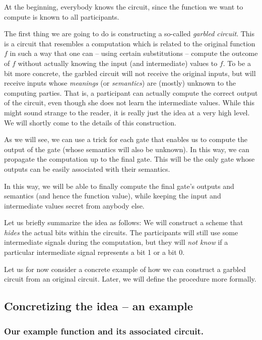 \message{ !name(seminar.tex)}\documentclass{llncs}
\begin{document}
At the beginning, everybody knows the circuit, since the function we want to compute is known to all participants.

The first thing we are going to do is constructing a so-called \emph{garbled circuit}. This is a circuit that resembles a computation which is related to the original function $f$ in such a way that one can -- using certain substitutions -- compute the outcome of $f$ without actually knowing the input (and intermediate) values to $f$. To be a bit more concrete, the garbled circuit will not receive the original inputs, but will receive inputs whose \emph{meanings} (or \emph{semantics}) are (mostly) unknown to the computing parties. That is, a participant can actually compute the correct output of the circuit, even though she does not learn the intermediate values. While this might sound strange to the reader, it is really just the idea at a very high level. We will shortly come to the details of this construction.

As we will see, we can use a trick for each gate that enables us to compute the output of the gate (whose semantics will also be unknown). In this way, we can propagate the computation up to the final gate. This will be the only gate whose outputs can be easily associated with their semantics.

In this way, we will be able to finally compute the final gate's outputs and semantics (and hence the function value), while keeping the input and intermediate values secret from anybody else.

Let us briefly summarize the idea as follows: We will construct a scheme that \emph{hides} the actual bits within the circuits. The participants will still use some intermediate signals during the computation, but they will \emph{not know} if a particular intermediate signal represents a bit 1 or a bit 0.

Let us for now consider a concrete example of how we can construct a garbled circuit from an original circuit. Later, we will define the procedure more formally.

\subsection{Concretizing the idea -- an example}
\label{sec:concrete-idea}

\subsubsection{Our example function and its associated circuit.}
\label{sec:our-example-function-and-its-circuit}
\end{document}
